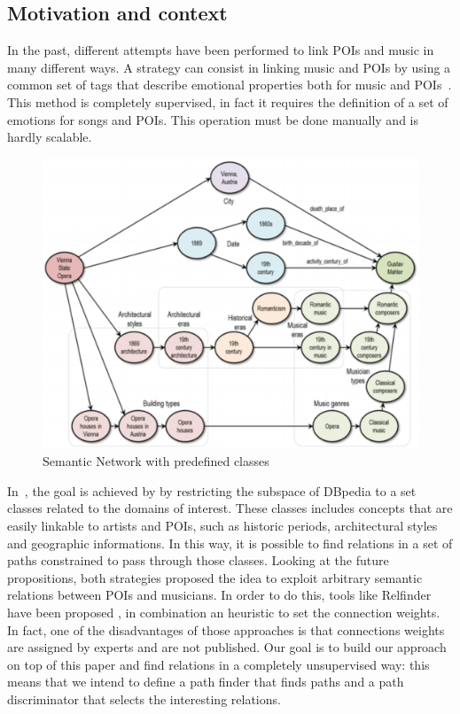 \documentclass[paper=a4, fontsize=11pt]{scrartcl}
\begin{document}
\subsection{Motivation and context}
In the past, different attempts have been performed to link POIs and music in many different ways. A strategy can consist in linking music and POIs by using a common set of tags that describe emotional properties both for music and POIs~\cite{Kaminskas:2013:LMR:2507157.2507180}. This method is completely supervised, in fact it requires the definition of a set of emotions for songs and POIs. This operation must be done manually and is hardly scalable.
\begin{figure}[!htb]
  \centering
    \includegraphics[width=1\textwidth]{images/semantic_net.png}
    \caption{Semantic Network with predefined classes}
\end{figure}

In~\cite{Kaminskas:2012:KMR:2390848.2390854}, the goal is achieved by by restricting the subspace of DBpedia to a set classes related to the domains of interest. These classes includes concepts that are easily linkable to artists and POIs, such as historic periods, architectural styles and geographic informations. In this way, it is possible to find relations in a set of paths constrained to pass through those classes.
Looking at the future propositions, both strategies proposed the idea to exploit arbitrary semantic relations between POIs and musicians.
In order to do this, tools like Relfinder have been proposed \cite{Heim:2009:RRR:1695324.1695351}, in combination an heuristic to set the connection weights. In fact, one of the disadvantages of those approaches is that connections weights are assigned by experts and are not published.
Our goal is to build our approach on top of this paper and find relations in a completely unsupervised way: this means that we intend to define a path finder that finds paths and a path discriminator that selects the interesting relations.
\end{document}
